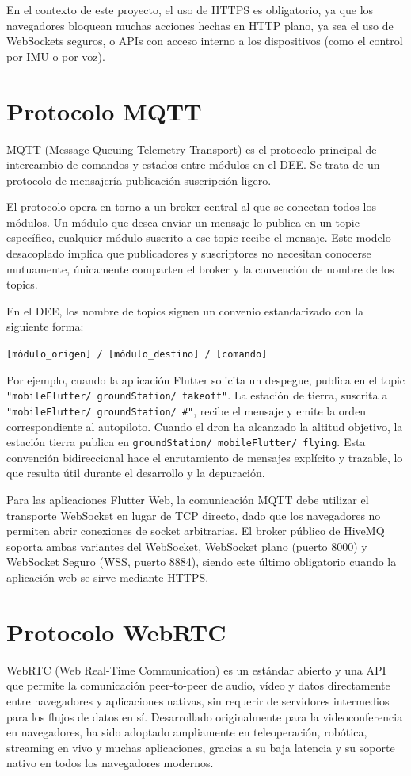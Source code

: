 En el contexto de este proyecto, el uso de HTTPS es obligatorio, ya que los navegadores bloquean muchas acciones hechas en HTTP plano, ya sea el uso de WebSockets seguros, o APIs con acceso interno a los dispositivos (como el control por IMU o por voz)\cite{bloqueo_http}.

\section{Protocolo MQTT}
MQTT (Message Queuing Telemetry Transport)\cite{mqtt} es el protocolo principal de intercambio de comandos y estados entre módulos en el DEE. Se trata de un protocolo de mensajería publicación-suscripción ligero.

El protocolo opera en torno a un broker central al que se conectan todos los módulos. Un módulo que desea enviar un mensaje lo publica en un topic específico, cualquier módulo suscrito a ese topic recibe el mensaje. Este modelo desacoplado implica que publicadores y suscriptores no necesitan conocerse mutuamente, únicamente comparten el broker y la convención de nombre de los topics.

En el DEE, los nombre de topics siguen un convenio estandarizado con la siguiente forma:

\texttt{[módulo\_origen] / [módulo\_destino] / [comando]}

Por ejemplo, cuando la aplicación Flutter solicita un despegue, publica en el topic \texttt{"mobileFlutter/ groundStation/ takeoff"}. La estación de tierra, suscrita a \texttt{"mobileFlutter/ groundStation/  \#"}, recibe el mensaje y emite la orden correspondiente al autopiloto. Cuando el dron ha alcanzado la altitud objetivo, la estación tierra publica en \texttt{groundStation/ mobileFlutter/ flying}. Esta convención bidireccional hace el enrutamiento de mensajes explícito y trazable, lo que resulta útil durante el desarrollo y la depuración.

Para las aplicaciones Flutter Web, la comunicación MQTT debe utilizar el transporte WebSocket en lugar de TCP directo, dado que los navegadores no permiten abrir conexiones de socket arbitrarias. El broker público de HiveMQ soporta ambas variantes del WebSocket, WebSocket plano (puerto 8000) y WebSocket Seguro (WSS, puerto 8884), siendo este último obligatorio cuando la aplicación web se sirve mediante HTTPS.

\section{Protocolo WebRTC}
WebRTC (Web Real-Time Communication)\cite{webrtc} es un estándar abierto y una API que permite la comunicación peer-to-peer de audio, vídeo y datos directamente entre navegadores y aplicaciones nativas, sin requerir de servidores intermedios para los flujos de datos en sí. Desarrollado originalmente para la videoconferencia en navegadores, ha sido adoptado ampliamente en teleoperación, robótica, streaming en vivo y muchas aplicaciones, gracias a su baja latencia y su soporte nativo en todos los navegadores modernos.


